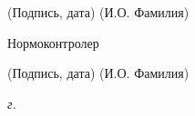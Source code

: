 \begin{titlepage}
\vspace{-2ex}
\noindent\hspace{13.5ex}\normalsize\hspace{170pt}\hspace{2ex}%
\scriptsize{(Подпись, дата)}\normalsize\hspace{30pt}\hspace{6ex}%
\scriptsize{(И.О. Фамилия)}\normalsize

\bigskip

\noindent Нормоконтролер \hfill
\ulfield{4cm}{}\quad
{}

\vspace{-2ex}
\noindent\hspace{13.5ex}\normalsize\hspace{170pt}\hspace{2ex}%
\scriptsize{(Подпись, дата)}\normalsize\hspace{30pt}\hspace{6ex}%
\scriptsize{(И.О. Фамилия)}\normalsize

\vfill

\begin{center}
\textsl{\the\year{} г.}
\end{center}
\end{titlepage}